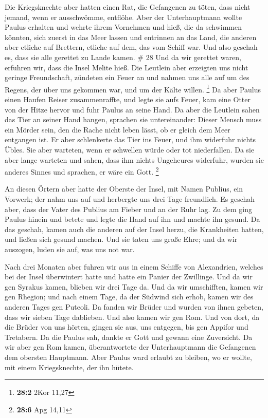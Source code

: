  Die Kriegsknechte aber hatten einen Rat, die Gefangenen
zu töten, dass nicht jemand, wenn er ausschwömme, entflöhe.
 Aber der Unterhauptmann wollte Paulus erhalten und
wehrte ihrem Vornehmen und hieß, die da schwimmen könnten, sich zuerst
in das Meer lassen und entrinnen an das Land,  die
anderen aber etliche auf Brettern, etliche auf dem, das vom Schiff war.
Und also geschah es, dass sie alle gerettet zu Lande kamen. \# 28
 Und da wir gerettet waren, erfuhren wir, dass die Insel
Melite hieß.  Die Leutlein aber erzeigten uns nicht
geringe Freundschaft, zündeten ein Feuer an und nahmen uns alle auf um
des Regens, der über uns gekommen war, und um der Kälte willen.
\footnote{\textbf{28:2} 2Kor 11,27}  Da aber Paulus einen
Haufen Reiser zusammenraffte, und legte sie aufs Feuer, kam eine Otter
von der Hitze hervor und fuhr Paulus an seine Hand.  Da
aber die Leutlein sahen das Tier an seiner Hand hangen, sprachen sie
untereinander: Dieser Mensch muss ein Mörder sein, den die Rache nicht
leben lässt, ob er gleich dem Meer entgangen ist.  Er aber
schlenkerte das Tier ins Feuer, und ihm widerfuhr nichts Übles.
 Sie aber warteten, wenn er schwellen würde oder tot
niederfallen. Da sie aber lange warteten und sahen, dass ihm nichts
Ungeheures widerfuhr, wurden sie anderes Sinnes und sprachen, er wäre
ein Gott. \footnote{\textbf{28:6} Apg 14,11}

 An diesen Örtern aber hatte der Oberste der Insel, mit
Namen Publius, ein Vorwerk; der nahm uns auf und herbergte uns drei Tage
freundlich.  Es geschah aber, dass der Vater des Publius
am Fieber und an der Ruhr lag. Zu dem ging Paulus hinein und betete und
legte die Hand auf ihn und machte ihn gesund.  Da das
geschah, kamen auch die anderen auf der Insel herzu, die Krankheiten
hatten, und ließen sich gesund machen.  Und sie taten uns
große Ehre; und da wir auszogen, luden sie auf, was uns not war.

 Nach drei Monaten aber fuhren wir aus in einem Schiffe
von Alexandrien, welches bei der Insel überwintert hatte und hatte ein
Panier der Zwillinge.  Und da wir gen Syrakus kamen,
blieben wir drei Tage da.  Und da wir umschifften, kamen
wir gen Rhegion; und nach einem Tage, da der Südwind sich erhob, kamen
wir des anderen Tages gen Puteoli.  Da fanden wir Brüder
und wurden von ihnen gebeten, dass wir sieben Tage dablieben. Und also
kamen wir gen Rom.  Und von dort, da die Brüder von uns
hörten, gingen sie aus, uns entgegen, bis gen Appifor und Tretabern. Da
die Paulus sah, dankte er Gott und gewann eine Zuversicht.
 Da wir aber gen Rom kamen, überantwortete der
Unterhauptmann die Gefangenen dem obersten Hauptmann. Aber Paulus ward
erlaubt zu bleiben, wo er wollte, mit einem Kriegsknechte, der ihn
hütete.


